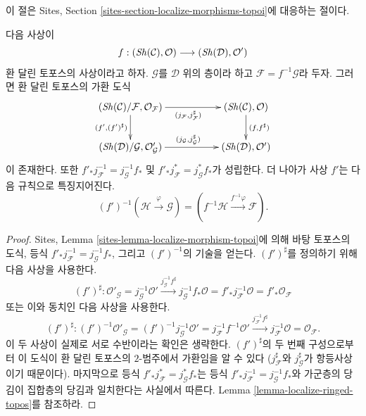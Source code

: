 \noindent
이 절은 Sites, Section \ref{sites-section-localize-morphisms-topoi}에
대응하는 절이다.

\begin{lemma}
\label{lemma-localize-morphism-ringed-topoi}
다음 사상이
$$
f :
(\mathop{\mathit{Sh}}\nolimits(\mathcal{C}), \mathcal{O})
\longrightarrow
(\mathop{\mathit{Sh}}\nolimits(\mathcal{D}), \mathcal{O}')
$$
환 달린 토포스의 사상이라고 하자. $\mathcal{G}$를 $\mathcal{D}$ 위의 층이라
하고 $\mathcal{F} = f^{-1}\mathcal{G}$라 두자. 그러면 환 달린 토포스의
가환 도식
$$
\xymatrix{
(\Sh(\mathcal{C})/\mathcal{F}, \mathcal{O}_\mathcal{F})
\ar[rr]_{(j_\mathcal{F}, j_\mathcal{F}^\sharp)}
\ar[d]_{(f', (f')^\sharp)} & &
(\Sh(\mathcal{C}), \mathcal{O}) \ar[d]^{(f, f^\sharp)} \\
(\Sh(\mathcal{D})/\mathcal{G}, \mathcal{O}'_\mathcal{G})
\ar[rr]^{(j_\mathcal{G}, j_\mathcal{G}^\sharp)} & &
(\Sh(\mathcal{D}), \mathcal{O}')
}
$$
이 존재한다. 또한 $f'_*j_\mathcal{F}^{-1} = j_\mathcal{G}^{-1}f_*$ 및
$f'_*j_\mathcal{F}^* = j_\mathcal{G}^*f_*$가 성립한다. 더 나아가 사상
$f'$는 다음 규칙으로 특징지어진다.
$$
(f')^{-1}(\mathcal{H} \xrightarrow{\varphi} \mathcal{G})
=
(f^{-1}\mathcal{H} \xrightarrow{f^{-1}\varphi} \mathcal{F}).
$$
\end{lemma}

\begin{proof}
Sites, Lemma \ref{sites-lemma-localize-morphism-topoi}에 의해 바탕 토포스의
도식, 등식 $f'_*j_\mathcal{F}^{-1} = j_\mathcal{G}^{-1}f_*$, 그리고
$(f')^{-1}$의 기술을 얻는다. $(f')^\sharp$를 정의하기 위해 다음 사상을
사용한다.
$$
(f')^\sharp :
\mathcal{O}'_\mathcal{G} =
j_\mathcal{G}^{-1} \mathcal{O}'
\xrightarrow{j_\mathcal{G}^{-1}f^\sharp}
j_\mathcal{G}^{-1} f_*\mathcal{O} =
f'_* j_\mathcal{F}^{-1}\mathcal{O} =
f'_* \mathcal{O}_\mathcal{F}
$$
또는 이와 동치인 다음 사상을 사용한다.
$$
(f')^\sharp :
(f')^{-1}\mathcal{O}'_\mathcal{G} =
(f')^{-1}j_\mathcal{G}^{-1} \mathcal{O}' =
j_\mathcal{F}^{-1}f^{-1}\mathcal{O}'
\xrightarrow{j_\mathcal{F}^{-1}f^\sharp}
j_\mathcal{F}^{-1} \mathcal{O} =
\mathcal{O}_\mathcal{F}.
$$
이 두 사상이 실제로 서로 수반이라는 확인은 생략한다. $(f')^\sharp$의 두 번째
구성으로부터 이 도식이 환 달린 토포스의 $2$-범주에서 가환임을 알 수 있다
($j_\mathcal{F}^\sharp$와 $j_\mathcal{G}^\sharp$가 항등사상이기 때문이다).
마지막으로 등식 $f'_*j_\mathcal{F}^* = j_\mathcal{G}^*f_*$는 등식
$f'_*j_\mathcal{F}^{-1} = j_\mathcal{G}^{-1}f_*$와 가군층의 당김이 집합층의
당김과 일치한다는 사실에서 따른다. Lemma \ref{lemma-localize-ringed-topos}를
참조하라.
\end{proof}

